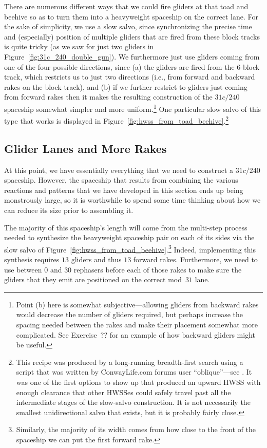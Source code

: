 There are numerous different ways that we could fire gliders at that toad and beehive so as to turn them into a heavyweight spaceship on the correct lane. For the sake of simplicity, we use a slow salvo, since synchronizing the precise time and (especially) position of multiple gliders that are fired from these block tracks is quite tricky (as we saw for just two gliders in Figure~\ref{fig:31c_240_double_gun}). We furthermore just use gliders coming from one of the four possible directions, since (a) the gliders are fired from the $6$-block track, which restricts us to just two directions (i.e., from forward and backward rakes on the block track), and (b) if we further restrict to gliders just coming from forward rakes then it makes the resulting construction of the $31c/240$ spaceship somewhat simpler and more uniform.\footnote{Point (b) here is somewhat subjective---allowing gliders from backward rakes would decrease the number of gliders required, but perhaps increase the spacing needed between the rakes and make their placement somewhat more complicated. See Exercise~?? for an example of how backward gliders might be useful.} One particular slow salvo of this type that works is displayed in Figure~\ref{fig:hwss_from_toad_beehive}.\footnote{This recipe was produced by a long-running breadth-first search using a script that was written by ConwayLife.com forums user ``oblique''---see . It was one of the first options to show up that produced an upward HWSS with enough clearance that other HWSSes could safely travel past all the intermediate stages of the slow-salvo construction. It is not necessarily the smallest unidirectional salvo that exists, but it is probably fairly close.}


\subsection{Glider Lanes and More Rakes}\label{sec:silverfish_more_rakes}

At this point, we have essentially everything that we need to construct a $31c/240$ spaceship. However, the spaceship that results from combining the various reactions and patterns that we have developed in this section ends up being monstrously large, so it is worthwhile to spend some time thinking about how we can reduce its size prior to assembling it.

The majority of this spaceship's length will come from the multi-step process needed to synthesize the heavyweight spaceship pair on each of its sides via the slow salvo of Figure~\ref{fig:hwss_from_toad_beehive}.\footnote{Similarly, the majority of its width comes from how close to the front of the spaceship we can put the first forward rake.} Indeed, implementing this synthesis requires $13$ gliders and thus $13$ forward rakes. Furthermore, we need to use between $0$ and $30$ rephasers before each of those rakes to make sure the gliders that they emit are positioned on the correct mod~$31$ lane.

